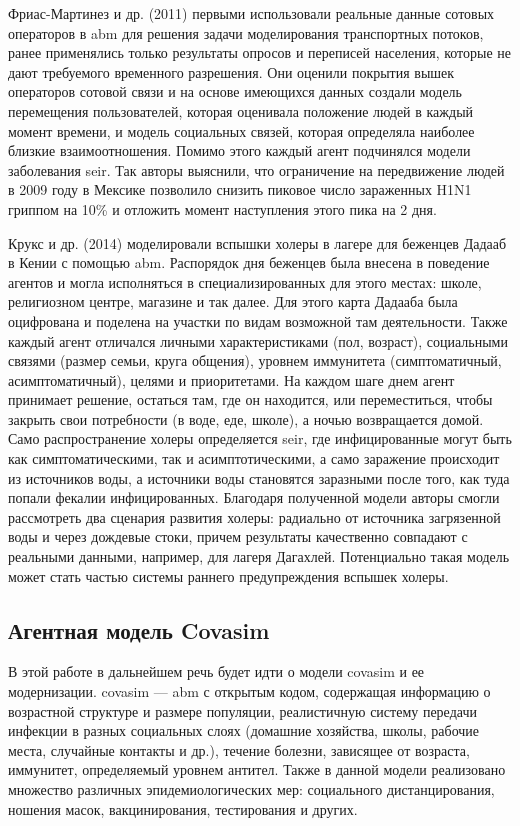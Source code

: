 \documentclass[a4paper,12pt]{article} %
\begin{document}
Фриас-Мартинез и др. (2011) \cite{frias2011agent} первыми использовали реальные данные сотовых операторов в \gls{abm} для решения задачи моделирования транспортных потоков, ранее применялись только результаты опросов и переписей населения, которые не дают требуемого временного разрешения. Они оценили покрытия вышек операторов сотовой связи и на основе имеющихся данных создали модель перемещения пользователей, которая оценивала положение людей в каждый момент времени, и модель социальных связей, которая определяла наиболее близкие взаимоотношения. Помимо этого каждый агент подчинялся модели заболевания \gls{seir}. Так авторы выяснили, что ограничение на передвижение людей в 2009 году в Мексике позволило снизить пиковое число зараженных H1N1 гриппом на 10\% и отложить момент наступления этого пика на 2 дня.


Крукс и др. (2014) \cite{crooks2014agent} моделировали вспышки холеры в лагере для беженцев Дадааб в Кении с помощью \gls{abm}. Распорядок дня беженцев была внесена в поведение агентов и могла исполняться в специализированных для этого местах: школе, религиозном центре, магазине и так далее. Для этого карта Дадааба была оцифрована и поделена на участки по видам возможной там деятельности. Также каждый агент отличался личными характеристиками (пол, возраст), социальными связями (размер семьи, круга общения), уровнем иммунитета (симптоматичный, асимптоматичный), целями и приоритетами. На каждом шаге днем агент принимает решение, остаться там, где он находится, или переместиться, чтобы закрыть свои потребности (в воде, еде, школе), а ночью возвращается домой. Само распространение холеры определяется \gls{seir}, где инфицированные могут быть как симптоматическими, так и асимптотическими, а само заражение происходит из источников воды, а источники воды становятся заразными после того, как туда попали фекалии инфицированных. Благодаря полученной модели авторы смогли рассмотреть два сценария развития холеры: радиально от источника загрязенной воды и через дождевые стоки, причем результаты качественно совпадают с реальными данными, например, для лагеря Дагахлей. Потенциально такая модель может стать частью системы раннего предупреждения вспышек холеры.




\subsection{Агентная модель Covasim}

В этой работе в дальнейшем речь будет идти о модели \gls{covasim} и ее модернизации. \gls{covasim} --- \gls{abm} с открытым кодом, содержащая информацию о возрастной структуре и размере популяции, реалистичную систему передачи инфекции в разных социальных слоях (домашние хозяйства, школы, рабочие места, случайные контакты и др.), течение болезни, зависящее от возраста, иммунитет, определяемый уровнем антител. Также в данной модели реализовано множество различных эпидемиологических мер: социального дистанцирования, ношения масок, вакцинирования, тестирования и других.
\end{document}
